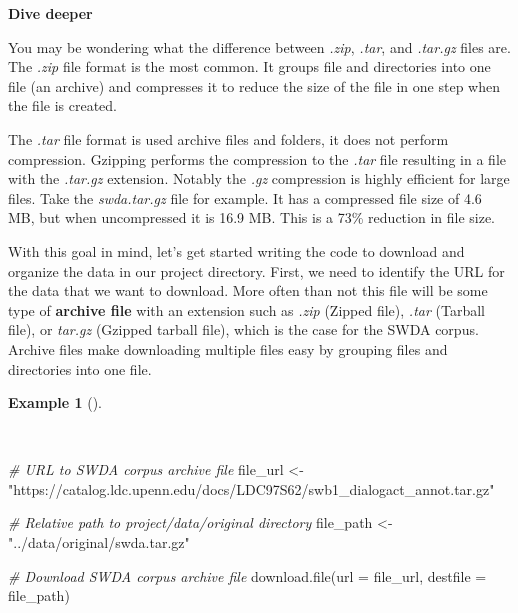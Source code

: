 \documentclass[
  letterpaper,
  krantz1]{latex/krantz-mod}
\newenvironment{Shaded}{\begin{snugshade}}{\end{snugshade}}
\newcommand{\AttributeTok}[1]{\textcolor[rgb]{0.00,0.00,0.00}{#1}}
\newcommand{\CommentTok}[1]{\textcolor[rgb]{0.00,0.00,0.00}{\textit{#1}}}
\newcommand{\FunctionTok}[1]{\textcolor[rgb]{0.00,0.00,0.00}{#1}}
\newcommand{\NormalTok}[1]{\textcolor[rgb]{0.00,0.00,0.00}{#1}}
\newcommand{\OtherTok}[1]{\textcolor[rgb]{0.00,0.00,0.00}{#1}}
\newcommand{\StringTok}[1]{\textcolor[rgb]{0.00,0.00,0.00}{#1}}
\theoremstyle{definition}
\theoremstyle{definition}
\newtheorem{example}{Example}[chapter]
\theoremstyle{remark}
\begin{document}
\begin{tcolorbox}[enhanced jigsaw, toprule=.15mm, breakable, colback=white, arc=.35mm, left=2mm, colframe=quarto-callout-color-frame, opacityback=0, bottomrule=.15mm, rightrule=.15mm, leftrule=.75mm]

\textbf{ Dive deeper}

You may be wondering what the difference between \emph{.zip},
\emph{.tar}, and \emph{.tar.gz} files are. The \emph{.zip} file format
is the most common. It groups file and directories into one file (an
archive) and compresses it to reduce the size of the file in one step
when the file is created.

The \emph{.tar} file format is used archive files and folders, it does
not perform compression. Gzipping performs the compression to the
\emph{.tar} file resulting in a file with the \emph{.tar.gz} extension.
Notably the \emph{.gz} compression is highly efficient for large files.
Take the \emph{swda.tar.gz} file for example. It has a compressed file
size of 4.6 MB, but when uncompressed it is 16.9 MB. This is a 73\%
reduction in file size.

\end{tcolorbox}

With this goal in mind, let's get started writing the code to download
and organize the data in our project directory. First, we need to
identify the URL for the data that
we want to download. More often than not this file will be some type of
\textbf{archive file} with an extension such as
\emph{.zip} (Zipped file), \emph{.tar} (Tarball file), or \emph{tar.gz}
(Gzipped tarball file), which is the case for the SWDA corpus. Archive
files make downloading multiple files easy by grouping files and
directories into one file.

\begin{example}[]\protect\hypertarget{exm-acquire-swda-download-file}{}\label{exm-acquire-swda-download-file}

~

\begin{Shaded}
\begin{Highlighting}[numbers=left,,]
\CommentTok{\# URL to SWDA corpus archive file}
\NormalTok{file\_url }\OtherTok{\textless{}{-}}
  \StringTok{"https://catalog.ldc.upenn.edu/docs/LDC97S62/swb1\_dialogact\_annot.tar.gz"}

\CommentTok{\# Relative path to project/data/original directory}
\NormalTok{file\_path }\OtherTok{\textless{}{-}} \StringTok{"../data/original/swda.tar.gz"}

\CommentTok{\# Download SWDA corpus archive file}
\FunctionTok{download.file}\NormalTok{(}\AttributeTok{url =}\NormalTok{ file\_url, }\AttributeTok{destfile =}\NormalTok{ file\_path)}
\end{Highlighting}
\end{Shaded}

\end{example}
\end{document}
